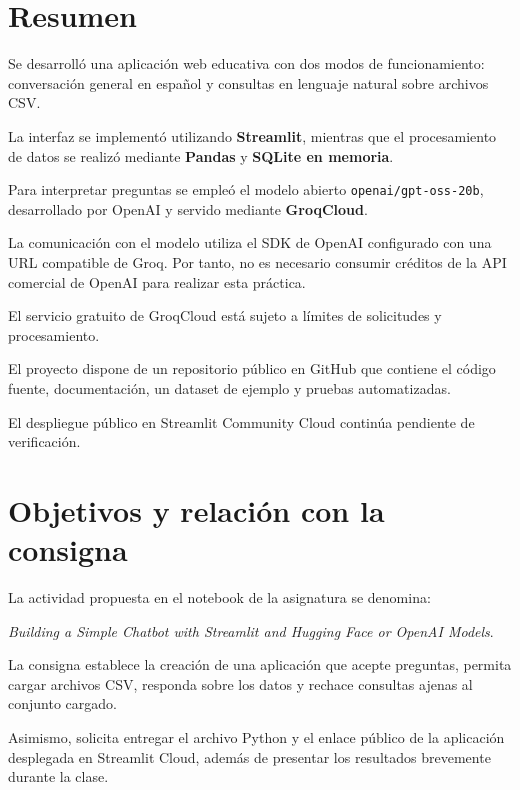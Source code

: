 \documentclass[11pt,a4paper]{article}
\begin{document}
\tableofcontents
\newpage

\section{Resumen}

Se desarrolló una aplicación web educativa con dos modos
de funcionamiento: conversación general en español y
consultas en lenguaje natural sobre archivos CSV.

La interfaz se implementó utilizando \textbf{Streamlit},
mientras que el procesamiento de datos se realizó mediante
\textbf{Pandas} y \textbf{SQLite en memoria}.

Para interpretar preguntas se empleó el modelo abierto
\texttt{openai/gpt-oss-20b}, desarrollado por OpenAI y
servido mediante \textbf{GroqCloud}.

La comunicación con el modelo utiliza el SDK de OpenAI
configurado con una URL compatible de Groq. Por tanto,
no es necesario consumir créditos de la API comercial
de OpenAI para realizar esta práctica.

El servicio gratuito de GroqCloud está sujeto a límites
de solicitudes y procesamiento.

El proyecto dispone de un repositorio público en GitHub
que contiene el código fuente, documentación,
un dataset de ejemplo y pruebas automatizadas.

El despliegue público en Streamlit Community Cloud
continúa pendiente de verificación.

\section{Objetivos y relación con la consigna}

La actividad propuesta en el notebook de la asignatura
se denomina:

\emph{Building a Simple Chatbot with Streamlit and
Hugging Face or OpenAI Models}.

La consigna establece la creación de una aplicación
que acepte preguntas, permita cargar archivos CSV,
responda sobre los datos y rechace consultas
ajenas al conjunto cargado.

Asimismo, solicita entregar el archivo Python
y el enlace público de la aplicación desplegada
en Streamlit Cloud, además de presentar los resultados
brevemente durante la clase.
\end{document}
